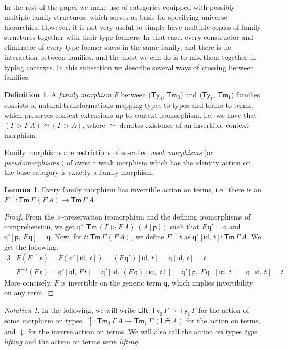 \documentclass[a4paper,UKenglish,cleveref, autoref, thm-restate]{lipics-v2021}
\theoremstyle{remark}
\newtheorem{notation}{Notation}
\theoremstyle{definition}
\newtheorem{mydefinition}{Definition}
\newtheorem{mylemma}{Lemma}
\newcommand{\Ty}{\mathsf{Ty}}
\newcommand{\Tm}{\mathsf{Tm}}
\newcommand{\id}{\mathsf{id}}
\newcommand{\ext}{\triangleright}
\newcommand{\p}{\mathsf{p}}
\newcommand{\q}{\mathsf{q}}
\newcommand{\up}{{\uparrow}}
\newcommand{\down}{{\downarrow}}
\newcommand{\Lift}{\mathsf{Lift}}
\begin{document}
In the rest of the paper we make use of categories equipped with possibly
multiple family structures, which serves as basis for specifying universe
hierarchies. However, it is not very useful to simply have multiple copies of
family structures together with their type formers. In that case, every
constructor and eliminator of every type former stays in the same family, and
there is no interaction between families, and the most we can do is to mix them
together in typing contexts. In this subsection we describe several ways of
crossing between families.

\begin{mydefinition}
A \emph{family morphism} $F$ between ($\Ty_0$, $\Tm_0$) and ($\Ty_1$, $\Tm_1$)
families consists of natural transformations mapping types to types and terms to
terms, which preserves context extensions up to context isomorphism, i.e.\ we
have that $(\Gamma \ext F\,A) \simeq (\Gamma \ext A)$, where $\simeq$ denotes
existence of an invertible context morphism.
\end{mydefinition}

Family morphisms are restrictions of so-called \emph{weak morphisms}
\cite{dependentrightadjoints} (or \emph{pseudomorphisms}
\cite{kaposi2019gluing}) of cwfs: a weak morphism which has the identity action
on the base category is exactly a family morphism.

\begin{mylemma} Every family morphism has invertible action on terms, i.e.\ there
  is an $F^{-1} : \Tm\,\Gamma\,(F\,A) \to \Tm\,\Gamma\,A$.
\end{mylemma}

\begin{proof}
From the $\ext$-preservation isomorphism and the defining isomorphisms of
comprehension, we get $\q' : \Tm\,(\Gamma \ext F\,A)\,(A[\p])$ such that $F\,\q'
= \q$ and $\q'[\p,\,F\,\q] = \q$. Now, for $t : \Tm\,\Gamma\,(F\,A)$, we
define $F^{-1}\,t$ as $\q'[\id,\,t] : \Tm\,\Gamma\,A$. We get the following:
\begin{alignat*}{3}
  & F(F^{-1}\,t) = F(\q'[\id,\,t]) = (F\,\q')[\id,\,t] = \q[\id,\,t] = t \\
  & F^{-1}(F\,t) = \q'[\id,\,F\,t] = \q'[\id,\,(F\,\q)[\id,\,\,t]] = \q'[\p,\,F\,\q][\id,\,t]
    = \q[\id,\,t] = t
\end{alignat*}
More concisely, $F$ is invertible on the generic term $\q$, which implies invertibility
on any term.
\end{proof}

\begin{notation}
In the following, we will write $\Lift : \Ty_0\,\Gamma \to \Ty_1\,\Gamma$ for
the action of some morphism on types, $\up : \Tm_0\,\Gamma\,A \to
\Tm_1\,\Gamma\,(\Lift\,A)$ for the action on terms, and $\down$ for the inverse
action on terms. We will also call the action on types \emph{type lifting}
and the action on terms \emph{term lifting}.
\end{notation}
\end{document}
